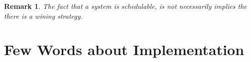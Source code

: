 \documentclass[ twoside, 12pt ]{article}
\newtheorem{remark}{Remark}
\begin{document}
\begin{remark}
    The fact that a system is schedulable, is not necessarily implies the there is a wining strategy.
\end{remark}


\section{Few Words about Implementation}


\end{document}

